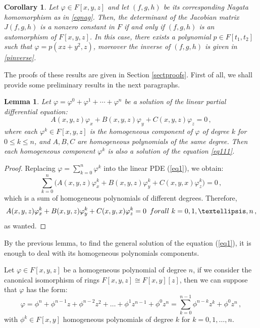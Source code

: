 \documentclass{amsart}
\newtheorem{cor}{Corollary}
\newtheorem{lem}{Lemma}
\begin{document}
\begin{cor}\label{mainth}
	Let  $\varphi\in F[x,y,z]$ and let $(f, g, h)$ be its corresponding Nagata homomorphism as in \eqref{eqnag}. 
	Then, the determinant of the Jacobian matrix $J(f,g,h)$ is a nonzero constant in $F$ if and only if $(f,g,h)$ is an automorphism of $F[x,y,z]$.
	In this case, there exists a polynomial $p\in F[t_1,t_2]$ such that $\varphi=p(xz+y^2,z)$, moreover the inverse of $(f,g,h)$ is given in \eqref{pinverse}.
\end{cor}


The proofs of these results are given in Section \ref{sectproofs}.  First of all, we shall provide some preliminary results in the next paragraphs.  




\begin{lem} \label{lemahom}
	Let $\varphi=\varphi^0+\varphi^1+\cdots+\varphi^n$ be a solution of the linear partial differential equation: 
	\begin{equation}\label{eq111}
		A(x,y,z)\varphi_x+B(x,y,z)\varphi_y+C(x,y,z)\varphi_z=0\,,
	\end{equation}
	where each $\varphi^{k}\in F[x,y, z]$ is the homogeneous component of $\varphi$ of degree $k$ for $0\leq k\leq n$, and $A,B,C$ are homogeneous polynomials of the same degree. Then each homogeneous component $\varphi^k$ is also a solution of the equation \eqref{eq111}.
\end{lem}

\begin{proof}
	Replacing $\varphi=\sum_{k=0}^{n}\varphi^k$ into the linear PDE (\ref{eq1}), we obtain:
	\begin{equation*}%
		\sum_{k=0}^n\Big(A(x,y,z)\varphi^k_x+B(x,y,z)\varphi^k_y+C(x,y,x)\varphi^k_z\Big)=0\,,
	\end{equation*}
	which is a sum of homogeneous polynomials of different degrees. Therefore, 
	\begin{equation*}
		A(x,y,z)\varphi^k_x+B(x,y,z)\varphi^k_y+C(x,y,x)\varphi^k_z=0 \,\,\, \textnormal{for all}\,\, k=0,1,\dots, n\,, 
	\end{equation*}
	as wanted. 
\end{proof}	

By the previous lemma, to find the general solution of the equation (\ref{eq1}), it is enough to deal with its homogeneous polynomials components. 

Let  $\varphi\in F[x,y,z]$ be a homogeneous polynomial of degree $n$, if we consider the canonical isomorphism of rings $F[x,y,z]\cong F[x,y][z]$, then we can suppose  that $\varphi$ has the form: 
\begin{equation}\label{dpch}
	\varphi=\phi^{n}+\phi^{n-1}z+\phi^{n-2}z^2+\dots +\phi^{1}z^{n-1}+\phi^0z^{n}=\sum_{k=0}^{n-1}\phi^{n-k}z^k+\phi^0z^{n}\,,
\end{equation}
with $\phi^{k}\in F[x,y]$ homogeneous polynomials of degree $k$ for $k=0,1,\dots,n$.
\end{document}
